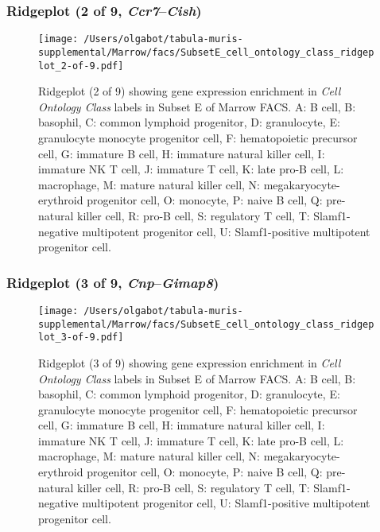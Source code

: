 \clearpage

\subsubsection{Ridgeplot (2 of 9, \emph{Ccr7}--\emph{Cish})}
\begin{figure}[h]
\centering
\texttt{[image: /Users/olgabot/tabula-muris-supplemental/Marrow/facs/SubsetE\_cell\_ontology\_class\_ridgeplot\_2-of-9.pdf]}

\caption{ Ridgeplot (2 of 9)  showing gene expression enrichment in \emph{Cell Ontology Class} labels in Subset E of Marrow FACS. A: B cell, B: basophil, C: common lymphoid progenitor, D: granulocyte, E: granulocyte monocyte progenitor cell, F: hematopoietic precursor cell, G: immature B cell, H: immature natural killer cell, I: immature NK T cell, J: immature T cell, K: late pro-B cell, L: macrophage, M: mature natural killer cell, N: megakaryocyte-erythroid progenitor cell, O: monocyte, P: naive B cell, Q: pre-natural killer cell, R: pro-B cell, S: regulatory T cell, T: Slamf1-negative multipotent progenitor cell, U: Slamf1-positive multipotent progenitor cell.}
\end{figure}


\clearpage

\subsubsection{Ridgeplot (3 of 9, \emph{Cnp}--\emph{Gimap8})}
\begin{figure}[h]
\centering
\texttt{[image: /Users/olgabot/tabula-muris-supplemental/Marrow/facs/SubsetE\_cell\_ontology\_class\_ridgeplot\_3-of-9.pdf]}

\caption{ Ridgeplot (3 of 9)  showing gene expression enrichment in \emph{Cell Ontology Class} labels in Subset E of Marrow FACS. A: B cell, B: basophil, C: common lymphoid progenitor, D: granulocyte, E: granulocyte monocyte progenitor cell, F: hematopoietic precursor cell, G: immature B cell, H: immature natural killer cell, I: immature NK T cell, J: immature T cell, K: late pro-B cell, L: macrophage, M: mature natural killer cell, N: megakaryocyte-erythroid progenitor cell, O: monocyte, P: naive B cell, Q: pre-natural killer cell, R: pro-B cell, S: regulatory T cell, T: Slamf1-negative multipotent progenitor cell, U: Slamf1-positive multipotent progenitor cell.}
\end{figure}


\clearpage

